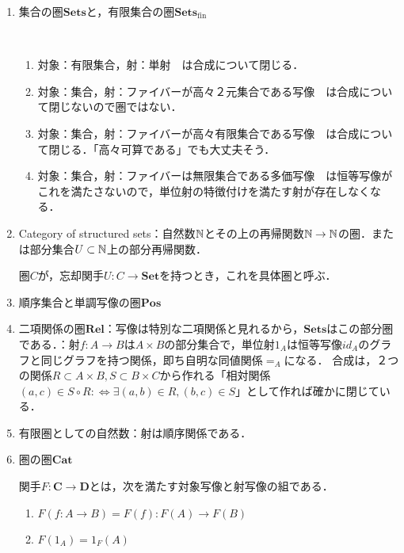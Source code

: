 \documentclass[uplatex, dvipdfmx]{jsarticle}
\begin{document}
\begin{enumerate}
    \item 集合の圏$\mathbf{Sets}$と，有限集合の圏$\mathbf{Sets}_\mathrm{fin}$
    \begin{example*}　
        \begin{enumerate}[(1)]
            \item 対象：有限集合，射：単射　は合成について閉じる．
            \item 対象：集合，射：ファイバーが高々２元集合である写像　は合成について閉じないので圏ではない．
            \item 対象：集合，射：ファイバーが高々有限集合である写像　は合成について閉じる．「高々可算である」でも大丈夫そう．
            \item 対象：集合，射：ファイバーは無限集合である多価写像　は恒等写像がこれを満たさないので，単位射の特徴付けを満たす射が存在しなくなる．
        \end{enumerate}
    \end{example*}
    \item Category of structured sets：自然数$\mathbb{N}$とその上の再帰関数$\mathbb{N}\to\mathbb{N}$の圏．または部分集合$U\subset\mathbb{N}$上の部分再帰関数．
    \begin{definition*}[具体圏]
        圏$C$が，忘却関手$U:C\to\mathbf{Set}$を持つとき，これを具体圏と呼ぶ．
    \end{definition*}
    \item 順序集合と単調写像の圏$\mathbf{Pos}$
    \item 二項関係の圏$\mathbf{Rel}$：写像は特別な二項関係と見れるから，$\mathbf{Sets}$はこの部分圏である．：射$f:A\to B$は$A\times B$の部分集合で，単位射$1_A$は恒等写像$id_A$のグラフと同じグラフを持つ関係，即ち自明な同値関係$=_A$になる．
    合成は，２つの関係$R\subset A\times B, S\subset B\times C$から作れる「相対関係$(a,c)\in S\circ R:\Leftrightarrow \exists (a,b)\in R, (b,c)\in S$」として作れば確かに閉じている．
    \item 有限圏としての自然数：射は順序関係である．
    \item 圏の圏$\mathbf{Cat}$
    \begin{definition}[Functor]
        関手$F:\mathbf{C}\to\mathbf{D}$とは，次を満たす対象写像と射写像の組である．
        \begin{enumerate}[(1)]
            \item $F(f:A\to B)=F(f):F(A)\to F(B)$
            \item $F(1_A)=1_F(A)$

\end{enumerate}
\end{definition}
\end{enumerate}
\end{document}
